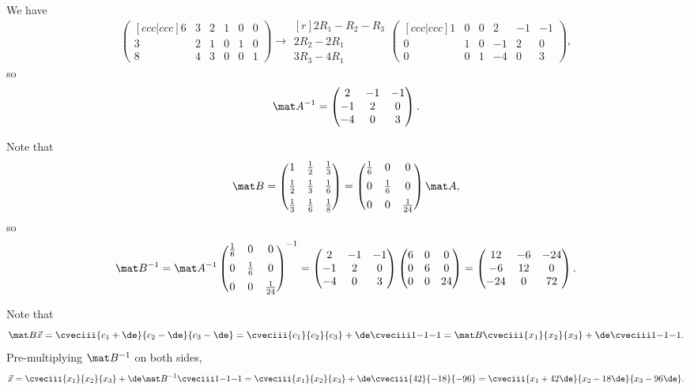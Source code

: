 \begin{solution}
    We have \[\begin{pmatrix}[ccc|ccc] 6 & 3 & 2 & 1 & 0 & 0 \\ 3 & 2 & 1 & 0 & 1 & 0 \\ 8 & 4 & 3 & 0 & 0 & 1\end{pmatrix} \rightarrow \begin{matrix}[r]\scriptstyle 2R_1 - R_2 - R_3 \\ \scriptstyle 2R_2-2R_1 \\ \scriptstyle 3R_3 - 4R_1\end{matrix} \begin{pmatrix}[ccc|ccc] 1 & 0 & 0 & 2 & -1 & -1 \\ 0 & 1 & 0 & -1 & 2 & 0 \\ 0 & 0 & 1 & -4 & 0 & 3\end{pmatrix},\] so \[\mat A^{-1} = \begin{pmatrix}2 & -1 & -1 \\ -1 & 2 & 0 \\ -4 & 0 & 3\end{pmatrix}.\]

    Note that \[\mat B = \begin{pmatrix}1 & \frac12 & \frac13 \\[0.5em] \frac12 & \frac13 & \frac16 \\[0.5em] \frac13 & \frac16 & \frac18\end{pmatrix} = \begin{pmatrix}\frac16 & 0 & 0 \\[0.5em] 0 & \frac16 & 0 \\[0.5em] 0 & 0 & \frac1{24}\end{pmatrix} \mat A,\] so \[\mat B^{-1} = \mat A^{-1} \begin{pmatrix}\frac16 & 0 & 0 \\[0.5em] 0 & \frac16 & 0 \\[0.5em] 0 & 0 & \frac1{24}\end{pmatrix}^{-1} = \begin{pmatrix}2 & -1 & -1 \\ -1 & 2 & 0 \\ -4 & 0 & 3\end{pmatrix} \begin{pmatrix}6 & 0 & 0 \\ 0 & 6 & 0 \\ 0 & 0 & 24\end{pmatrix} = \begin{pmatrix}12 & -6 & -24 \\ -6 & 12 & 0 \\ -24 & 0 & 72\end{pmatrix}.\]

    Note that \[\mat B \vec x = \cveciii{c_1 + \de}{c_2 - \de}{c_3 - \de} = \cveciii{c_1}{c_2}{c_3} + \de \cveciii1{-1}{-1} = \mat B \cveciii{x_1}{x_2}{x_3} + \de \cveciii1{-1}{-1}.\] Pre-multiplying $\mat B^{-1}$ on both sides, \[\vec x = \cveciii{x_1}{x_2}{x_3} + \de \mat B^{-1} \cveciii1{-1}{-1} = \cveciii{x_1}{x_2}{x_3} + \de \cveciii{42}{-18}{-96} = \cveciii{x_1 + 42\de}{x_2 - 18\de}{x_3 - 96\de}.\]
\end{solution}

